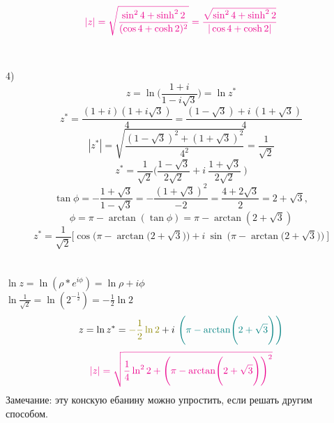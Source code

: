 \documentclass[14pt]{extarticle}
\begin{document}
\begin{displaymath}
    \color{magenta}|z|=\sqrt{\frac{\sin^2 4+\sinh^2 2}{(\cos4 + \cosh 2)^2}}=
    \frac{\sqrt{\sin^2 4+\sinh^2 2}}{|\cos4 + \cosh 2|}
\end{displaymath}
\\ \\
4)
\begin{displaymath}
    z=\ln\biggl(\frac{1+i}{1-i\sqrt{3}}\biggr)=\ln z^*
\end{displaymath}
\begin{displaymath}
    z^* = \frac{(1+i)(1+i\sqrt{3})}{4}= \frac{(1-\sqrt{3})+i \ (1+\sqrt{3})}{4}
\end{displaymath}
\begin{displaymath}
    |z^*|=\sqrt{\frac{(1-\sqrt{3})^2+(1+\sqrt{3})^2}{4^2}}=\frac{1}{\sqrt{2}}
\end{displaymath}
\begin{displaymath}
    z^*=\frac{1}{\sqrt{2}}
    \biggl(\frac{1-\sqrt{3}}{2\sqrt{2}}+i \ \frac{1+\sqrt{3}}{2\sqrt{2}}\ \biggr)
\end{displaymath}
\begin{displaymath}
    \tan \phi = -\frac{1+\sqrt{3}}{1-\sqrt{3}}=-\frac{(1+\sqrt{3})^2}{-2}=
    \frac{4+2\sqrt{3}}{2}=2+\sqrt{3}, 
\end{displaymath}
\begin{displaymath}
    \phi = \pi - \arctan(\tan \phi)=\pi - \arctan(2+\sqrt{3})
\end{displaymath}
\begin{displaymath}
    z^*=\frac{1}{\sqrt{2}}
    \biggl[\cos 
    \Biggl(\pi - \arctan\Biggl(2+\sqrt{3}\Biggr)\Biggr)
    +i \ \sin \ \Biggl(\pi - \arctan\Biggl(2+\sqrt{3}\Biggr)\Biggr)\ \biggr]
\end{displaymath}
\\ \\
$\ln z = \ln (\rho * e ^ {i\phi}) = \ln \rho + i \phi$\\
$\ln \frac{1}{\sqrt{2}} = \ln (2^{-\frac{1}{2}}) = -\frac{1}{2}\ln 2$
\begin{displaymath}
    z=\ln z^* = \textcolor{olive}{-\frac{1}{2}\ln 2}
    +i \ \textcolor{teal}
    {\Biggl(\pi - \arctan\Biggl(2+\sqrt{3}\Biggr)\Biggr)}
\end{displaymath}
\begin{displaymath}
    \color{magenta}|z|=\sqrt{\frac{1}{4}\ln ^2 2+
    \Biggl(\pi - \arctan\Biggl(2+\sqrt{3}\Biggr)\Biggr)^2}
\end{displaymath}
Замечание: эту конскую ебанину можно упростить, если решать другим способом. 
\end{document}
